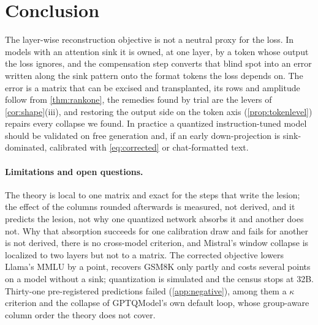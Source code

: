 \section{Conclusion}
\label{sec:conclusion}
The layer-wise reconstruction objective is not a neutral proxy for the loss.
In models with an attention sink it is owned, at one layer, by a token whose output the loss ignores, and the compensation step converts that blind spot into an error written along the sink pattern onto the format tokens the loss depends on.
The error is a matrix that can be excised and transplanted, its rows and amplitude follow from \cref{thm:rankone}, the remedies found by trial are the levers of \cref{cor:shape}(iii), and restoring the output side on the token axis (\cref{prop:tokenlevel}) repairs every collapse we found.
In practice a quantized instruction-tuned model should be validated on free generation and, if an early down-projection is sink-dominated, calibrated with \cref{eq:corrected} or chat-formatted text.

\paragraph{Limitations and open questions.}
The theory is local to one matrix and exact for the steps that write the lesion; the effect of the columns rounded afterwards is measured, not derived, and it predicts the lesion, not why one quantized network absorbs it and another does not.
Why that absorption succeeds for one calibration draw and fails for another is not derived, there is no cross-model criterion, and Mistral's window collapse is localized to two layers but not to a matrix.
The corrected objective lowers Llama's MMLU by a point, recovers GSM8K only partly and costs several points on a model without a sink; quantization is simulated and the census stops at 32B.
Thirty-one pre-registered predictions failed (\cref{app:negative}), among them a $\kappa$ criterion and the collapse of GPTQModel's own default loop, whose group-aware column order the theory does not cover.
